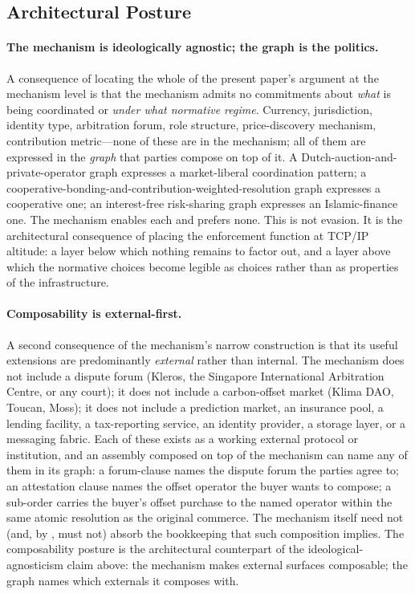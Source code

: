\documentclass[11pt,a4paper]{article}
\theoremstyle{definition}
\theoremstyle{remark}
\begin{document}
\subsection{Architectural Posture}
\label{sec:architectural-posture}

\paragraph{The mechanism is ideologically agnostic; the graph is the
politics.} A consequence of locating the whole of the present
paper's argument at the mechanism level is that the mechanism admits no
commitments about \emph{what} is being coordinated or \emph{under
what normative regime}. Currency, jurisdiction, identity type,
arbitration forum, role structure, price-discovery mechanism,
contribution metric---none of these are in the mechanism; all of
them are expressed in the \emph{graph} that parties compose on top
of it. A Dutch-auction-and-private-operator graph expresses a
market-liberal coordination pattern; a
cooperative-bonding-and-contribution-weighted-resolution graph
expresses a cooperative one; an interest-free risk-sharing graph
expresses an Islamic-finance one. The mechanism enables each and
prefers none. This is not evasion. It is the architectural
consequence of placing the enforcement function at TCP/IP altitude:
a layer below which nothing remains to factor out, and a layer
above which the normative choices become legible as choices rather
than as properties of the infrastructure.

\paragraph{Composability is external-first.} A second consequence
of the mechanism's narrow construction is that its useful extensions
are predominantly \emph{external} rather than internal.
The mechanism does not include a dispute forum (Kleros, the Singapore
International Arbitration Centre, or any court); it does not
include a carbon-offset market (Klima DAO, Toucan, Moss); it does
not include a prediction market, an insurance pool, a lending
facility, a tax-reporting service, an identity provider, a storage
layer, or a messaging fabric. Each of these exists as a working
external protocol or institution, and an assembly composed on top
of the mechanism can name any of them in its graph: a forum-clause
names the dispute forum the parties agree to; an attestation
clause names the offset operator the buyer wants to compose;
a sub-order carries the buyer's offset purchase to the named
operator within the same atomic resolution as the original commerce.
The mechanism itself need not (and, by
, must not) absorb the bookkeeping
that such composition implies. The composability posture is the
architectural counterpart of the ideological-agnosticism claim
above: the mechanism makes external surfaces composable; the graph
names which externals it composes with.
\end{document}
